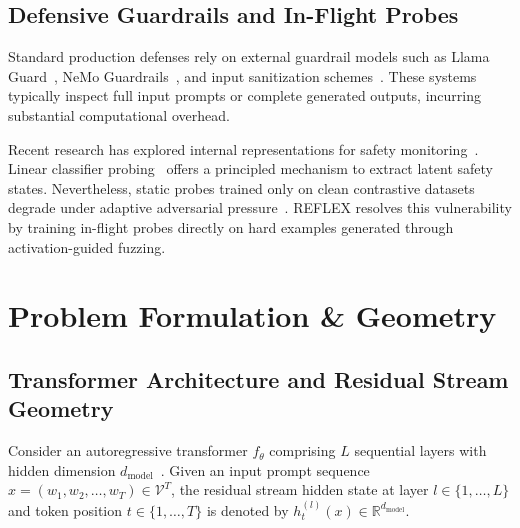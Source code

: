 \documentclass[manuscript,screen,review,anonymous]{acmart}
\begin{document}
\subsection{Defensive Guardrails and In-Flight Probes}
Standard production defenses rely on external guardrail models such as Llama Guard~\cite{inan2023llama,meta2024llamaguard2}, NeMo Guardrails~\cite{rebedea2023nemo}, and input sanitization schemes~\cite{robey2023smoothllm}. These systems typically inspect full input prompts or complete generated outputs, incurring substantial computational overhead. 

Recent research has explored internal representations for safety monitoring~\cite{sharma2025constitutional,cunningham2026constitutional,zhang2025jbshield,kadali2026jailbreaking}. Linear classifier probing~\cite{alain2016understanding,belinkov2022probing,tenney2019bert,hewitt2019designing,ravfogel2020null} offers a principled mechanism to extract latent safety states. Nevertheless, static probes trained only on clean contrastive datasets degrade under adaptive adversarial pressure~\cite{nasr2025adaptive}. REFLEX resolves this vulnerability by training in-flight probes directly on hard examples generated through activation-guided fuzzing.

\section{Problem Formulation \& Geometry}

\subsection{Transformer Architecture and Residual Stream Geometry}
Consider an autoregressive transformer $f_\theta$ comprising $L$ sequential layers with hidden dimension $d_{\text{model}}$~\cite{elhage2021mathematical,geva2021transformer,dai2022knowledge,vonoswald2023transformers}. Given an input prompt sequence $x = (w_1, w_2, \dots, w_T) \in \mathcal{V}^T$, the residual stream hidden state at layer $l \in \{1, \dots, L\}$ and token position $t \in \{1, \dots, T\}$ is denoted by $h_t^{(l)}(x) \in \mathbb{R}^{d_{\text{model}}}$.
\end{document}
